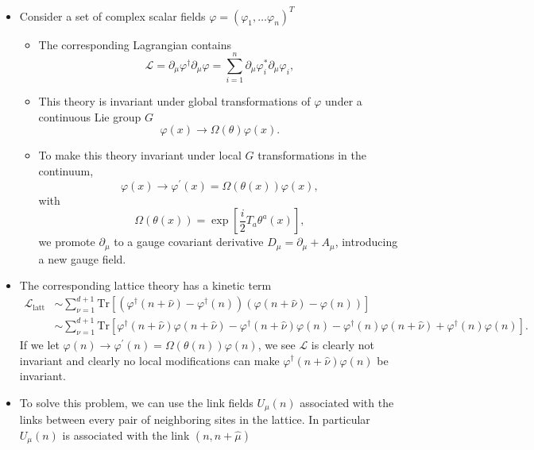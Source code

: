 \begin{itemize}
\item Consider a set of complex scalar fields $\varphi = (\varphi_1, \ldots \varphi_n)^T$
    \begin{itemize}
    \item The corresponding Lagrangian contains
    \begin{equation}
        \mathcal{L} = \partial_\mu \varphi^\dagger \partial_\mu \varphi = \sum_{i=1}^n \partial_\mu \varphi_i^* \partial_\mu \varphi_i,
    \end{equation}
    \item This theory is invariant under global transformations of $\varphi$ under a continuous Lie group $G$
    \begin{equation}
        \varphi(x) \rightarrow \Omega(\theta) \varphi(x).
    \end{equation}
    \item To make this theory invariant under local $G$ transformations in the continuum,
    \begin{equation}
        \varphi(x) \rightarrow \varphi^\prime(x) = \Omega(\theta(x)) \varphi(x),
    \end{equation}
    with
    \begin{equation}
        \Omega(\theta(x)) = \exp \left[ \frac{i}{2}T_a \theta^a(x) \right],
    \end{equation}
    we promote $\partial_\mu$ to a gauge covariant derivative $D_\mu=\partial_\mu+A_\mu$, introducing a new gauge field.
    \end{itemize}
\item The corresponding lattice theory has a kinetic term
\begin{align}
    \mathcal{L}_\text{latt} &\sim \sum_{\nu = 1}^{d+1}\text{Tr}[(\varphi^\dagger(n + \hat{\nu}) - \varphi^\dagger(n))(\varphi(n + \hat{\nu}) - \varphi(n)) ] \nonumber \\
    &\sim \sum_{\nu = 1}^{d+1}\text{Tr}\left[\varphi^\dagger(n + \hat{\nu})\varphi(n + \hat{\nu}) - \varphi^\dagger(n + \hat{\nu}) \varphi(n) - \varphi^\dagger(n)\varphi(n + \hat{\nu}) + \varphi^\dagger(n)\varphi(n) \right].
\end{align}
If we let $\varphi(n) \rightarrow \varphi^\prime(n) = \Omega(\theta(n))\varphi(n)$, we see $\mathcal{L}$ is clearly not invariant and clearly no local modifications can make $\varphi^\dagger(n + \hat{\nu})\varphi(n)$ be invariant.
\item To solve this problem, we can use the link fields $U_\mu(n)$ associated with the links between every pair of neighboring sites in the lattice. In particular $U_\mu(n)$ is associated with the link $(n, n+\hat \mu)$

\end{itemize}
